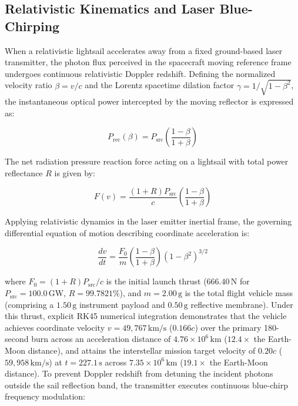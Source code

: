 \documentclass[aps,prd,reprint,superscriptaddress,nofootinbib,floatfix]{revtex4-2}
\begin{document}
\subsection{Relativistic Kinematics and Laser Blue-Chirping}
When a relativistic lightsail accelerates away from a fixed ground-based laser transmitter, the photon flux perceived in the spacecraft moving reference frame undergoes continuous relativistic Doppler redshift. Defining the normalized velocity ratio $\beta=v/c$ and the Lorentz spacetime dilation factor $\gamma=1/\sqrt{1-\beta^2}$, the instantaneous optical power intercepted by the moving reflector is expressed as:

\begin{equation}
P_{\mathrm{rec}}(\beta) = P_{\mathrm{src}} \left( \frac{1-\beta}{1+\beta} \right)
\label{eq:prec}
\end{equation}

The net radiation pressure reaction force acting on a lightsail with total power reflectance $R$ is given by:

\begin{equation}
F(v) = \frac{(1+R)P_{\mathrm{src}}}{c} \left( \frac{1-\beta}{1+\beta} \right)
\label{eq:thrust}
\end{equation}

Applying relativistic dynamics in the laser emitter inertial frame, the governing differential equation of motion describing coordinate acceleration is:

\begin{equation}
\frac{dv}{dt} = \frac{F_0}{m} \left( \frac{1-\beta}{1+\beta} \right) (1-\beta^2)^{3/2}
\label{eq:acceleration}
\end{equation}

where $F_0=(1+R)P_{\mathrm{src}}/c$ is the initial launch thrust ($666.40\,\mathrm{N}$ for $P_{\mathrm{src}}=100.0\,\mathrm{GW}$, $R=99.7821\%$), and $m=2.00\,\mathrm{g}$ is the total flight vehicle mass (comprising a $1.50\,\mathrm{g}$ instrument payload and $0.50\,\mathrm{g}$ reflective membrane). Under this thrust, explicit RK45 numerical integration demonstrates that the vehicle achieves coordinate velocity $v=49,767\,\mathrm{km/s}$ ($0.166c$) over the primary 180-second burn across an acceleration distance of $4.76\times 10^6\,\mathrm{km}$ ($12.4\times$ the Earth-Moon distance), and attains the interstellar mission target velocity of $0.20c$ ($59,958\,\mathrm{km/s}$) at $t=227.1\,\mathrm{s}$ across $7.35\times 10^6\,\mathrm{km}$ ($19.1\times$ the Earth-Moon distance). To prevent Doppler redshift from detuning the incident photons outside the sail reflection band, the transmitter executes continuous blue-chirp frequency modulation:
\end{document}

